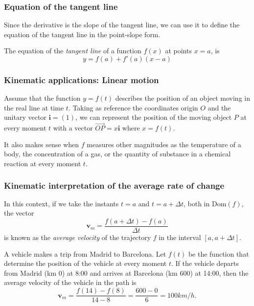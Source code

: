 \begin{frame}
	\frametitle{Equation of the tangent line}
  Since the derivative is the slope of the tangent line, we can use it to define the equation of the tangent line in the point-slope form.
  	  
	\begin{definition}
    The equation of the \emph{tangent line} of a function $f(x)$ at points $x=a$, is 
    \[
      y = f(a)+f'(a)(x-a)
    \]
	\end{definition}
\end{frame}


\begin{frame}
	\frametitle{Kinematic applications: Linear motion}
	Assume that the function $y=f(t)$ describes the position of an object moving in the real line at time $t$.
	Taking as reference the coordinates origin $O$ and the unitary vector $\mathbf{i}=(1)$, we can represent the position of the moving object $P$ at every moment $t$ with a vector $\vec{OP}=x\mathbf{i}$ where $x=f(t)$.
	\begin{center}
		
	\end{center}
	
	 It also makes sense when $f$ measures other magnitudes as the temperature of a body, the concentration of a gas, or the quantity of substance in a chemical reaction at every moment $t$.
\end{frame}


\begin{frame}
	\frametitle{Kinematic interpretation of the average rate of change}
	In this context, if we take the instants $t=a$ and $t=a+\Delta t$, both in $\mbox{Dom}(f)$, the vector
	\[
		\mathbf{v}_m=\frac{f(a+\Delta t)-f(a)}{\Delta t}
	\]
	is known as the \emph{average velocity} of the trajectory $f$ in the interval $[a, a+\Delta t]$.
	
	A vehicle makes a trip from Madrid to Barcelona.
	Let $f(t)$ be the function that determine the position of the vehicle at every moment $t$.
	If the vehicle departs from Madrid (km 0) at 8:00 and arrives at Barcelona (km 600) at 14:00, then the average velocity
	of the vehicle in the path is
	\[
		\mathbf{v}_m=\frac{f(14)-f(8)}{14-8}=\frac{600-0}{6} = 100 km/h.
	\]
\end{frame}


